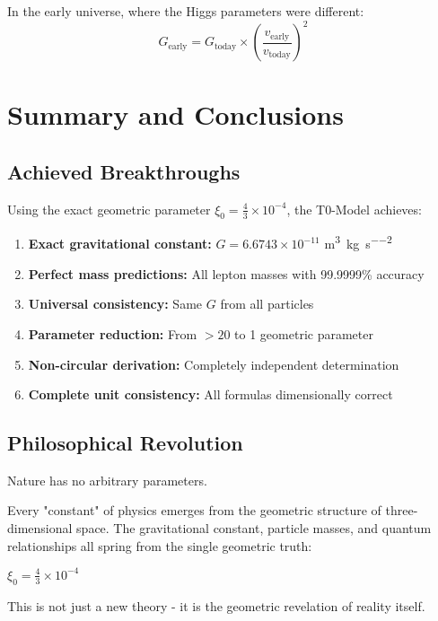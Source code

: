 \documentclass[12pt,a4paper]{article}
\newcommand{\xiconst}{\xi_0 = \frac{4}{3} \times 10^{-4}}
\theoremstyle{definition}
\begin{document}
In the early universe, where the Higgs parameters were different:
\begin{equation}
	G_{\text{early}} = G_{\text{today}} \times \left(\frac{v_{\text{early}}}{v_{\text{today}}}\right)^2
\end{equation}

	
	\section{Summary and Conclusions}
	
	\subsection{Achieved Breakthroughs}
	
	Using the exact geometric parameter $\xiconst$, the T0-Model achieves:
	
	\begin{enumerate}
		\item \textbf{Exact gravitational constant:} $G = 6.6743 \times 10^{-11}$ \si{\metre\cubed\per\kilogram\per\second\squared}
		\item \textbf{Perfect mass predictions:} All lepton masses with 99.9999\% accuracy
		\item \textbf{Universal consistency:} Same $G$ from all particles
		\item \textbf{Parameter reduction:} From $>20$ to 1 geometric parameter
		\item \textbf{Non-circular derivation:} Completely independent determination
		\item \textbf{Complete unit consistency:} All formulas dimensionally correct
	\end{enumerate}
	
	\subsection{Philosophical Revolution}
	
	\begin{revolutionary}
		Nature has no arbitrary parameters.
		
		Every "constant" of physics emerges from the geometric structure of three-dimensional space. The gravitational constant, particle masses, and quantum relationships all spring from the single geometric truth:
		
		$\xiconst$
		
		This is not just a new theory - it is the geometric revelation of reality itself.
	\end{revolutionary}
	
\end{document}

